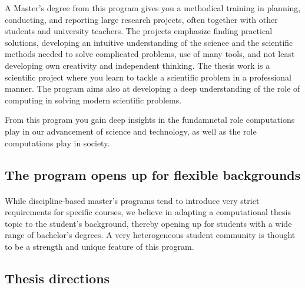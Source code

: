 \documentclass[%
oneside,                 %
final,                   %
10pt]{article}
\begin{document}
A Master’s degree from this program gives you a methodical
training in planning, conducting, and reporting large research
projects, often together with other students and university teachers.
The projects emphasize finding practical solutions, developing an
intuitive understanding of the science and the scientific methods
needed to solve complicated problems, use of many tools, and not least
developing own creativity and independent thinking. The thesis
work is a scientific project where you learn to tackle a
scientific problem in a professional manner.   The program aims also at
developing a deep understanding of the role of computing in solving modern scientific
problems. 

From this program you gain  deep insights in the fundamnetal role
computations play  in our advancement of science and technology, as well as the role computations play  in society.



\subsection{The program opens up for flexible backgrounds}


\paragraph{}
While discipline-based master's programs tend to introduce very strict
requirements for specific courses, we believe in adapting a computational thesis
topic to the student's background, thereby opening up for
students with a wide range of bachelor's degrees.
A very heterogeneous student community is thought to be a strength and
unique feature of this program.



\subsection{Thesis directions}

\paragraph{}
\end{document}
